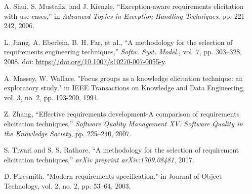 \documentclass[conference]{IEEEtran}
\begin{document}
\begin{thebibliography}{00}
 A. Shui, S. Mustafiz, and J. Kienzle, ``Exception-aware requirements elicitation with use cases,'' in \textit{Advanced Topics in Exception Handling Techniques}, pp. 221–242, 2006.

 L. Jiang, A. Eberlein, B. H. Far, et al., ``A methodology for the selection of requirements engineering techniques,'' \textit{Softw. Syst. Model.}, vol. 7, pp. 303--328, 2008. doi: \url{https://doi.org/10.1007/s10270-007-0055-y}.

 A. Massey, W. Wallace. "Focus groups as a knowledge elicitation technique: an exploratory study," in IEEE Transactions on Knowledge and Data Engineering, vol. 3, no. 2, pp. 193-200, 1991.

 Z. Zhang, ``Effective requirements development-A comparison of requirements elicitation techniques,'' \textit{Software Quality Management XV: Software Quality in the Knowledge Society}, pp. 225–240, 2007.

 S. Tiwari and S. S. Rathore, ``A methodology for the selection of requirement elicitation techniques,'' \textit{arXiv preprint arXiv:1709.08481}, 2017.

 D. Firesmith. "Modern requirements specification," in Journal of Object Technology, vol. 2, no. 2, pp. 53–64, 2003.

\end{thebibliography}
\end{document}
